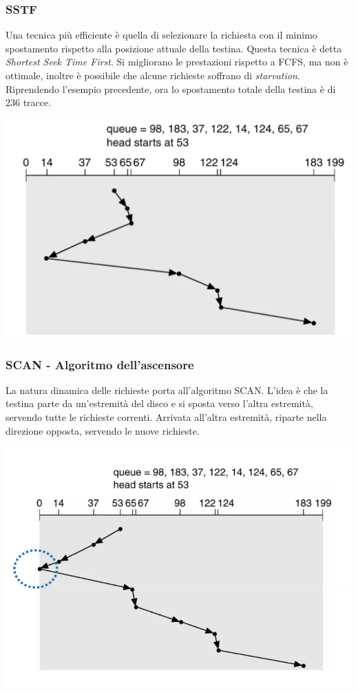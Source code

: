 \documentclass[a4paper,12pt, twoside]{report}
\begin{document}
\subsubsection{SSTF}
Una tecnica pi\`u efficiente \`e quella di selezionare la richiesta con il minimo spostamento 
rispetto alla posizione attuale della testina. Questa tecnica \`e detta \emph{Shortest Seek Time First}.
Si migliorano le prestazioni rispetto a FCFS, ma non \`e ottimale, inoltre \`e possibile che alcune 
richieste soffrano di \emph{starvation}. Riprendendo l'esempio precedente, ora lo spostamento totale
della testina \`e di 236 tracce. 
\begin{center}
    \includegraphics[scale=0.2]{sstf_disk}
\end{center}

\subsubsection{SCAN - Algoritmo dell'ascensore}
La natura dinamica delle richieste porta all'algoritmo SCAN. L'idea \`e che la testina parte da un'estremit\`a
del disco e si sposta verso l'altra estremit\`a, servendo tutte le richieste correnti. Arrivata all'altra 
estremit\`a, riparte nella direzione opposta, servendo le nuove richieste. 

\begin{center}
    \includegraphics[scale=0.2]{scan_disk}
\end{center}
\end{document}
